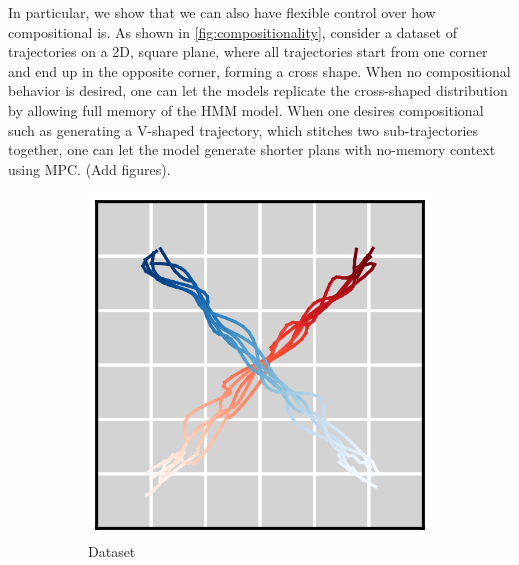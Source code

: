 In particular, we show that we can also have flexible control over how compositional \algo{} is. As shown in \ref{fig:compositionality}, consider a dataset of trajectories on a 2D, square plane, where all trajectories start from one corner and end up in the opposite corner, forming a cross shape. When no compositional behavior is desired, one can let the models replicate the cross-shaped distribution by allowing full memory of the HMM model. 
When one desires compositional such as generating a V-shaped trajectory, which stitches two sub-trajectories together, one can let the model generate shorter plans with no-memory context using MPC. (Add figures).

\begin{figure}[h]
    \centering
    \begin{subfigure}[t]{.3\linewidth}
        \centering\includegraphics[width=\linewidth]{figures/dataset_diagonal2d_thick_v3.png}
        \caption{Dataset} \label{fig:compositionality_dataset}
    \end{subfigure}
    \begin{subfigure}[t]{.3\linewidth}

\end{subfigure}
\end{figure}
